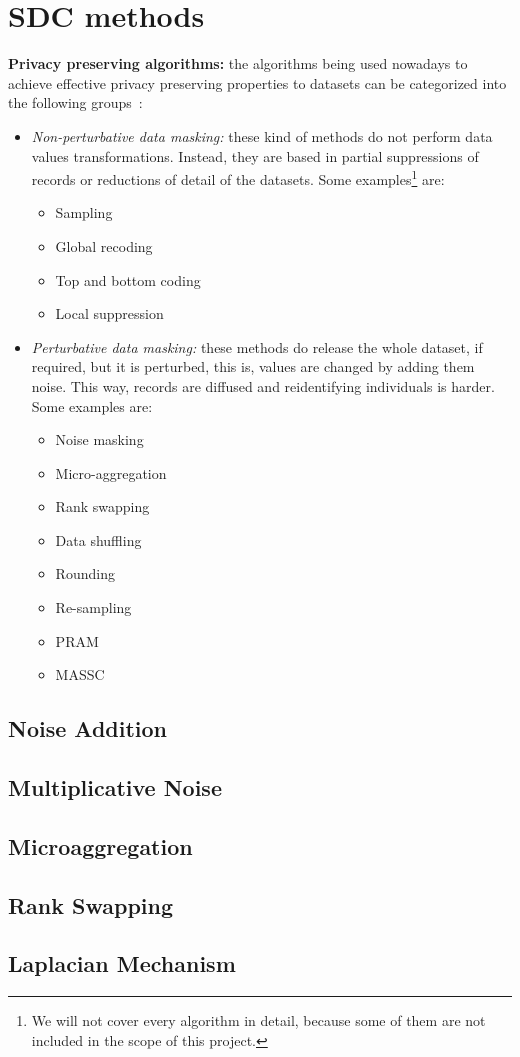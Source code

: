 \section{SDC methods}
\label{Theory::SDCMethods}

\textbf{Privacy preserving algorithms:} the algorithms being used nowadays to achieve effective privacy preserving properties to datasets can be categorized into the following groups~\cite{Hundepool:StatisticalDisclosureControl}:
\begin{itemize}
	\item \textit{Non-perturbative data masking:} these kind of methods do not perform data values transformations. Instead, they are based in partial suppressions of records or reductions of detail of the datasets. Some examples\footnote{We will not cover every algorithm in detail, because some of them are not included in the scope of this project.} are:
	\begin{itemize}
		\item Sampling
		\item Global recoding
		\item Top and bottom coding
		\item Local suppression
	\end{itemize}

	\item \textit{Perturbative data masking:} these methods do release the whole dataset, if required, but it is perturbed, this is, values are changed by adding them noise. This way, records are diffused and reidentifying individuals is harder. Some examples are:
	\begin{itemize}
		\item Noise masking
		\item Micro-aggregation
		\item Rank swapping
		\item Data shuffling
		\item Rounding
		\item Re-sampling
		\item PRAM
		\item MASSC
	\end{itemize}
\end{itemize}

\subsection{Noise Addition}
\label{Theory::SDCMethods::NoiseAddition}

\subsection{Multiplicative Noise}
\label{Theory::SDCMethods::MultiplicativeNoise}

\subsection{Microaggregation}
\label{Theory::SDCMethods::Microaggregation}

\subsection{Rank Swapping}
\label{Theory::SDCMethods::RankSwapping}

\subsection{Laplacian Mechanism}
\label{Theory::SDCMethods::LaplacianMechanism}
